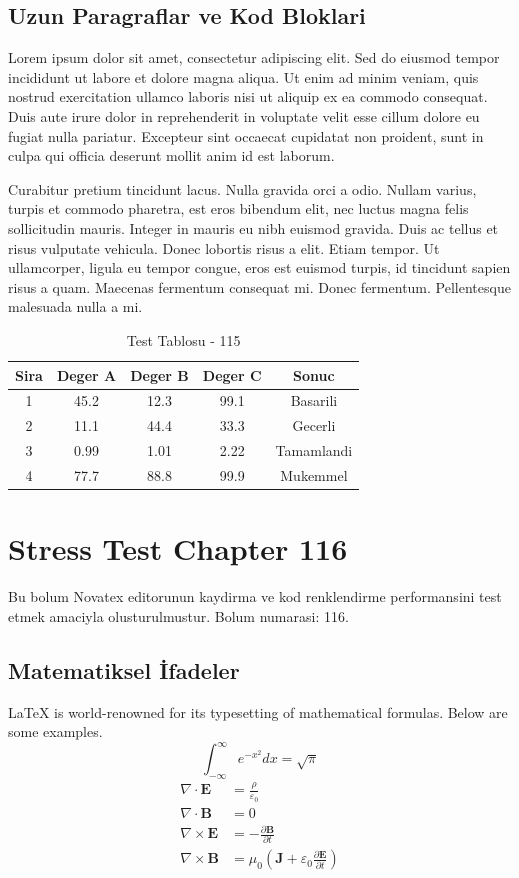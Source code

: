 \documentclass[12pt,a4paper]{article}
\begin{document}
\subsection{Uzun Paragraflar ve Kod Bloklari}
Lorem ipsum dolor sit amet, consectetur adipiscing elit. Sed do eiusmod tempor incididunt ut labore et dolore magna aliqua. Ut enim ad minim veniam, quis nostrud exercitation ullamco laboris nisi ut aliquip ex ea commodo consequat. Duis aute irure dolor in reprehenderit in voluptate velit esse cillum dolore eu fugiat nulla pariatur. Excepteur sint occaecat cupidatat non proident, sunt in culpa qui officia deserunt mollit anim id est laborum.

Curabitur pretium tincidunt lacus. Nulla gravida orci a odio. Nullam varius, turpis et commodo pharetra, est eros bibendum elit, nec luctus magna felis sollicitudin mauris. Integer in mauris eu nibh euismod gravida. Duis ac tellus et risus vulputate vehicula. Donec lobortis risus a elit. Etiam tempor. Ut ullamcorper, ligula eu tempor congue, eros est euismod turpis, id tincidunt sapien risus a quam. Maecenas fermentum consequat mi. Donec fermentum. Pellentesque malesuada nulla a mi.

\begin{table}[h!]
\centering
\begin{tabular}{|c|c|c|c|c|}
\hline
\textbf{Sira} & \textbf{Deger A} & \textbf{Deger B} & \textbf{Deger C} & \textbf{Sonuc} \\
\hline
1 & 45.2 & 12.3 & 99.1 & Basarili \\
2 & 11.1 & 44.4 & 33.3 & Gecerli \\
3 & 0.99 & 1.01 & 2.22 & Tamamlandi \\
4 & 77.7 & 88.8 & 99.9 & Mukemmel \\
\hline
\end{tabular}
\caption{Test Tablosu - 115}
\end{table}

\newpage
\section{Stress Test Chapter 116}
Bu bolum Novatex editorunun kaydirma ve kod renklendirme performansini test etmek amaciyla olusturulmustur. Bolum numarasi: 116.

\subsection{Matematiksel İfadeler}
\LaTeX{} is world-renowned for its typesetting of mathematical formulas. Below are some examples.
\begin{equation}
\int_{-\infty}^{\infty} e^{-x^2} dx = \sqrt{\pi}
\end{equation}
\begin{align}
\nabla \cdot \mathbf{E} &= \frac{\rho}{\varepsilon_0} \\
\nabla \cdot \mathbf{B} &= 0 \\
\nabla \times \mathbf{E} &= -\frac{\partial \mathbf{B}}{\partial t} \\
\nabla \times \mathbf{B} &= \mu_0\left(\mathbf{J} + \varepsilon_0 \frac{\partial \mathbf{E}}{\partial t}\right)
\end{align}
\end{document}
